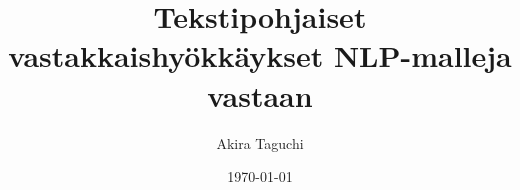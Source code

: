 \documentclass[finnish,twoside,censored,tkt]{HYthesisML}
\title{Tekstipohjaiset vastakkaishyökkäykset NLP-malleja vastaan}
\author{Akira Taguchi}
\date{\today}
\begin{document}
\maketitle




\mytableofcontents

\mainmatter








{}  %
\printbibliography

\backmatter
\begin{appendices}

% 

%
%


\end{appendices}
\end{document}
